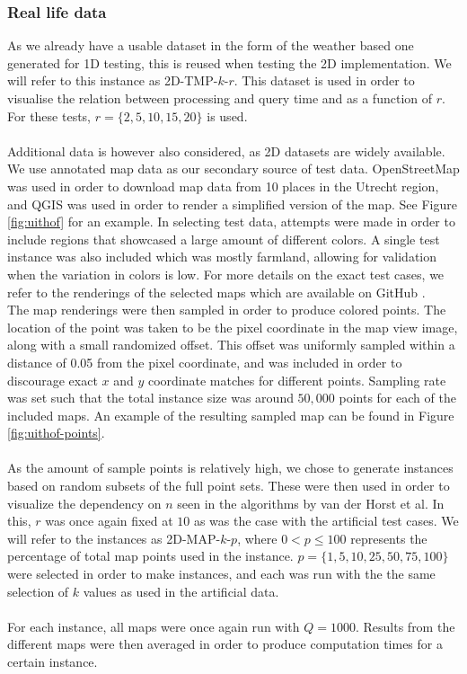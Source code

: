 \documentclass{article}
\newcommand{\fb}[1]{{\color{blue}#1}}
\begin{document}
\subsubsection*{Real life data}
\fb{As we already have a usable dataset in the form of the weather based one generated for 1D testing, this is reused when testing the 2D implementation. We will refer to this instance as 2D-TMP-$k$-$r$. This dataset is used in order to visualise the relation between processing and query time and as a function of $r$. For these tests, $r = \{ 2, 5, 10, 15, 20 \}$ is used.} \\\\
Additional data is however also considered, as 2D datasets are widely available. We use annotated map data as our secondary source of test data. OpenStreetMap \cite{OpenStreetMap} was used in order to download map data from 10 places in the Utrecht region, and QGIS \cite{QGIS_software} was used in order to render a simplified version of the map. See Figure \ref{fig:uithof} for an example. In selecting test data, attempts were made in order to include regions that showcased a large amount of different colors. A single test instance was also included which was mostly farmland, allowing for validation when the variation in colors is low. For more details on the exact test cases, we refer to the renderings of the selected maps which are available on GitHub \cite{vanderPlasImplementation}. \\
The map renderings were then sampled in order to produce colored points. The location of the point was taken to be the pixel coordinate in the map view image, along with a small randomized offset. This offset was uniformly sampled within a distance of 0.05 from the pixel coordinate, and was included in order to discourage exact $x$ and $y$ coordinate matches for different points. Sampling rate was set such that the total instance size was around $50,000$ points for each of the included maps. An example of the resulting sampled map can be found in Figure \ref{fig:uithof-points}. \\\\
\fb{As the amount of sample points is relatively high, we chose to generate instances based on random subsets of the full point sets. These were then used in order to visualize the dependency on $n$ seen in the algorithms by van der Horst et al. In this, $r$ was once again fixed at $10$ as was the case with the artificial test cases. We will refer to the instances as 2D-MAP-$k$-$p$, where $0 < p \leq 100$ represents the percentage of total map points used in the instance. $p=\{ 1, 5, 10, 25, 50, 75, 100 \}$ were selected in order to make instances, and each was run with the the same selection of $k$ values as used in the artificial data.} \\\\
\fb{For each instance, all maps were once again run with $Q=1000$. Results from the different maps were then averaged in order to produce computation times for a certain instance.}
\end{document}
